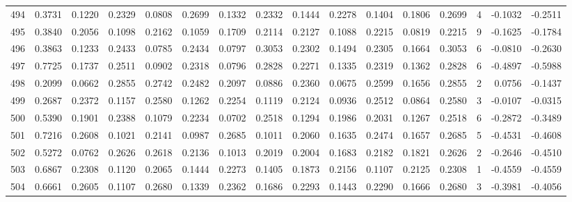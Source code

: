 \begin{tabular}{lrrrrrrrrrrrrrrr}
494 &      0.3731 &  0.1220 &  0.2329 &  0.0808 &  0.2699 &  0.1332 &  0.2332 &  0.1444 &  0.2278 &  0.1404 &   0.1806 &     0.2699 &      4 &                   -0.1032 &                    -0.2511 \\
495 &      0.3840 &  0.2056 &  0.1098 &  0.2162 &  0.1059 &  0.1709 &  0.2114 &  0.2127 &  0.1088 &  0.2215 &   0.0819 &     0.2215 &      9 &                   -0.1625 &                    -0.1784 \\
496 &      0.3863 &  0.1233 &  0.2433 &  0.0785 &  0.2434 &  0.0797 &  0.3053 &  0.2302 &  0.1494 &  0.2305 &   0.1664 &     0.3053 &      6 &                   -0.0810 &                    -0.2630 \\
497 &      0.7725 &  0.1737 &  0.2511 &  0.0902 &  0.2318 &  0.0796 &  0.2828 &  0.2271 &  0.1335 &  0.2319 &   0.1362 &     0.2828 &      6 &                   -0.4897 &                    -0.5988 \\
498 &      0.2099 &  0.0662 &  0.2855 &  0.2742 &  0.2482 &  0.2097 &  0.0886 &  0.2360 &  0.0675 &  0.2599 &   0.1656 &     0.2855 &      2 &                    0.0756 &                    -0.1437 \\
499 &      0.2687 &  0.2372 &  0.1157 &  0.2580 &  0.1262 &  0.2254 &  0.1119 &  0.2124 &  0.0936 &  0.2512 &   0.0864 &     0.2580 &      3 &                   -0.0107 &                    -0.0315 \\
500 &      0.5390 &  0.1901 &  0.2388 &  0.1079 &  0.2234 &  0.0702 &  0.2518 &  0.1294 &  0.1986 &  0.2031 &   0.1267 &     0.2518 &      6 &                   -0.2872 &                    -0.3489 \\
501 &      0.7216 &  0.2608 &  0.1021 &  0.2141 &  0.0987 &  0.2685 &  0.1011 &  0.2060 &  0.1635 &  0.2474 &   0.1657 &     0.2685 &      5 &                   -0.4531 &                    -0.4608 \\
502 &      0.5272 &  0.0762 &  0.2626 &  0.2618 &  0.2136 &  0.1013 &  0.2019 &  0.2004 &  0.1683 &  0.2182 &   0.1821 &     0.2626 &      2 &                   -0.2646 &                    -0.4510 \\
503 &      0.6867 &  0.2308 &  0.1120 &  0.2065 &  0.1444 &  0.2273 &  0.1405 &  0.1873 &  0.2156 &  0.1107 &   0.2125 &     0.2308 &      1 &                   -0.4559 &                    -0.4559 \\
504 &      0.6661 &  0.2605 &  0.1107 &  0.2680 &  0.1339 &  0.2362 &  0.1686 &  0.2293 &  0.1443 &  0.2290 &   0.1666 &     0.2680 &      3 &                   -0.3981 &                    -0.4056 \\

\end{tabular}
